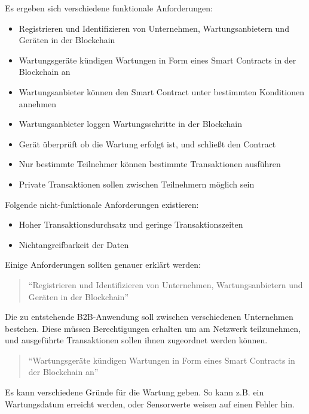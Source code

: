 Es ergeben sich verschiedene funktionale Anforderungen:
\begin{itemize}
    \item Registrieren und Identifizieren von Unternehmen, Wartungsanbietern und Geräten in der Blockchain
    \item Wartungsgeräte kündigen Wartungen in Form eines Smart Contracts in der Blockchain an
    \item Wartungsanbieter können den Smart Contract unter bestimmten Konditionen annehmen
    \item Wartungsanbieter loggen Wartungsschritte in der Blockchain
    \item Gerät überprüft ob die Wartung erfolgt ist, und schließt den Contract
    \item Nur bestimmte Teilnehmer können bestimmte Transaktionen ausführen
    \item Private Transaktionen sollen zwischen Teilnehmern möglich sein
\end{itemize}

Folgende nicht-funktionale Anforderungen existieren:

\begin{itemize}
    \item Hoher Transaktionsdurchsatz und geringe Transaktionszeiten
    \item Nichtangreifbarkeit der Daten
\end{itemize}

Einige Anforderungen sollten genauer erklärt werden:

\begin{quote}
    ``Registrieren und Identifizieren von Unternehmen, Wartungsanbietern und Geräten in der Blockchain''
\end{quote}

Die zu entstehende B2B-Anwendung soll zwischen verschiedenen Unternehmen bestehen. Diese müssen Berechtigungen erhalten um am Netzwerk teilzunehmen, und ausgeführte Transaktionen sollen ihnen zugeordnet werden können.

\begin{quote}
    ``Wartungsgeräte kündigen Wartungen in Form eines Smart Contracts in der Blockchain an''
\end{quote}

Es kann verschiedene Gründe für die Wartung geben. So kann z.B. ein Wartungsdatum erreicht werden, oder Sensorwerte weisen auf einen Fehler hin.

